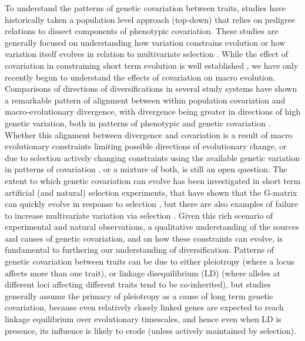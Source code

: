 \begin{refsection}
To understand the patterns of genetic covariation between traits,
studies have historically taken a population level approach (top-down)
that relies on pedigree relations to dissect components of phenotypic
covariation. These studies are generally focused on understanding how
variation constrains evolution or how variation itself evolves in
relation to multivariate selection \parencite{Arnold2008-pc,Futuyma2010-jl}.
While the effect of covariation in constraining short
term evolution is well established \parencite{Lande1979-by,Grant1995-er,Schluter1996-gw}
, we have only recently begun to
understand the effects of covariation on macro evolution. Comparisons of
directions of diversifications in several study systems have shown a
remarkable pattern of alignment between within population covariation
and macro-evolutionary divergence, with divergence being greater in
directions of high genetic variation, both in patterns of phenotypic
\parencite{Marroig2005-ce,Punzalan2016-lb,Simon2016-ed} and genetic
covariation \parencite{Houle2017-ph,McGlothlin2018-hm}. Whether this alignment between
divergence and covariation is a result of macro evolutionary constraints
limiting possible directions of evolutionary change, or due to selection
actively changing constraints using the available genetic variation in
patterns of covariation \parencite{Arnold2001-lz,Pavlicev2011-xm,Pavlicev2015-up,Walter2018-dw},
or a mixture of both, is still an open question. The extent to
which genetic covariation can evolve has been investigated in short term
artificial (and natural) selection experiments, that have shown that the
G-matrix can quickly evolve in response to selection \parencite{Careau2015-sy,Assis2016-vz,Penna2017-if},
but there are also
examples of failure to increase multivariate variation via selection \parencite{Sztepanacz2017-ot}.
Given this rich scenario of experimental and natural observations, a
qualitative understanding of the sources and causes of genetic
covariation, and on how these constraints can evolve, is fundamental to
furthering our understanding of diversification. Patterns of genetic
covariation between traits can be due to either pleiotropy (where a
locus affects more than one trait), or linkage disequilibrium (LD)
(where alleles at different loci affecting different traits tend to be
co-inherited), but studies generally assume the primacy of pleiotropy as
a cause of long term genetic covariation, because even relatively
closely linked genes are expected to reach linkage equilibrium over
evolutionary timescales, and hence even when LD is presence, its
influence is likely to erode (unless actively maintained by selection).


\end{refsection}
